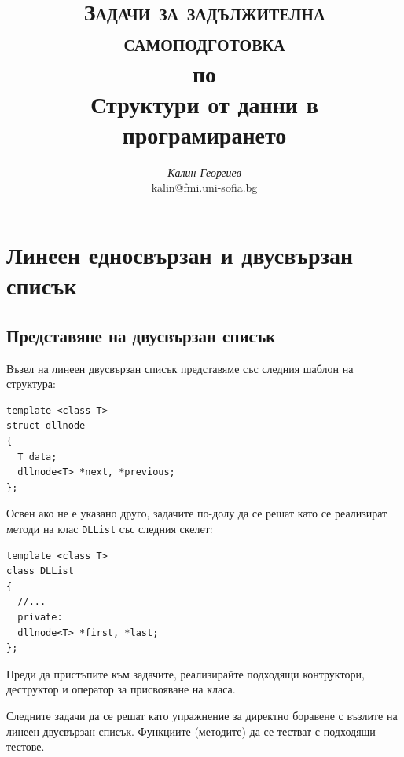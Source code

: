 \documentclass[12pt,a4paper]{article}
\author{\textit{Калин Георгиев}\\
\small{kalin@fmi.uni-sofia.bg}}
\title{\textsc{Задачи за задължителна самоподготовка} \\
по \\
Структури от данни в програмирането}
\newcommand{\code}[1]{\texttt{#1}}
\begin{document}
\maketitle

\tableofcontents

\pagebreak

\section {Линеен едносвързан и двусвързан списък}

\subsection {Представяне на двусвързан списък}

\begin{mdframed}[hidealllines=true,backgroundcolor=gray!20]
Възел на линеен двусвързан списък представяме със следния шаблон на структура:
\begin{verbatim}
template <class T>
struct dllnode
{
  T data;
  dllnode<T> *next, *previous;
};
\end{verbatim}
Освен ако не е указано друго, задачите по-долу да се решат като се реализират методи на клас \code{DLList} със следния скелет:
\begin{verbatim}
template <class T>
class DLList
{
  //...
  private:
  dllnode<T> *first, *last;
};
\end{verbatim}
Преди да пристъпите към задачите, реализирайте подходящи контруктори, деструктор и оператор за присвояване на класа.
\end{mdframed}

Следните задачи да се решат като упражнение за директно боравене с възлите на линеен двусвързан списък. Функциите (методите) да се тестват с подходящи тестове.
\end{document}
